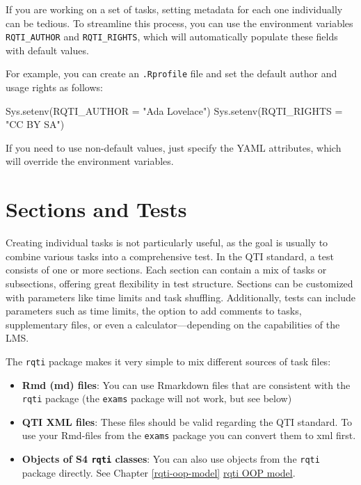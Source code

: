 \documentclass[twoside]{tufte-book}
\newenvironment{Shaded}{}{}
\newcommand{\AttributeTok}[1]{\textcolor[rgb]{0.49,0.56,0.16}{#1}}
\newcommand{\FunctionTok}[1]{\textcolor[rgb]{0.02,0.16,0.49}{#1}}
\newcommand{\NormalTok}[1]{#1}
\newcommand{\StringTok}[1]{\textcolor[rgb]{0.25,0.44,0.63}{#1}}
\providecommand{\tightlist}{%
  \setlength{\itemsep}{0pt}\setlength{\parskip}{0pt}}
\begin{document}
If you are working on a set of tasks, setting metadata for each one individually can be tedious. To streamline this process, you can use the environment variables \texttt{RQTI\_AUTHOR} and \texttt{RQTI\_RIGHTS}, which will automatically populate these fields with default values.

For example, you can create an \texttt{.Rprofile} file and set the default author and usage rights as follows:

\begin{Shaded}
\begin{Highlighting}[]
\FunctionTok{Sys.setenv}\NormalTok{(}\AttributeTok{RQTI\_AUTHOR =} \StringTok{"Ada Lovelace"}\NormalTok{)}
\FunctionTok{Sys.setenv}\NormalTok{(}\AttributeTok{RQTI\_RIGHTS =} \StringTok{"CC BY SA"}\NormalTok{)}
\end{Highlighting}
\end{Shaded}

If you need to use non-default values, just specify the YAML attributes, which will override the environment variables.

\chapter{Sections and Tests}\label{sections-and-tests}

Creating individual tasks is not particularly useful, as the goal is usually to combine various tasks into a comprehensive test. In the QTI standard, a test consists of one or more sections. Each section can contain a mix of tasks or subsections, offering great flexibility in test structure. Sections can be customized with parameters like time limits and task shuffling. Additionally, tests can include parameters such as time limits, the option to add comments to tasks, supplementary files, or even a calculator---depending on the capabilities of the LMS. %

The \texttt{rqti} package makes it very simple to mix different sources of task files:

\begin{itemize}
\tightlist
\item
  \textbf{Rmd (md) files}: You can use Rmarkdown files that are consistent with the \texttt{rqti} package (the \texttt{exams} package will not work, but see below)
\item
  \textbf{QTI XML files}: These files should be valid regarding the QTI standard. To use your Rmd-files from the \texttt{exams} package you can convert them to xml first.
\item
  \textbf{Objects of S4 \texttt{rqti} classes}: You can also use objects from the \texttt{rqti} package directly. See Chapter \ref{rqti-oop-model} \href{rqti_oop_model.html}{rqti OOP model}.
\end{itemize}
\end{document}
